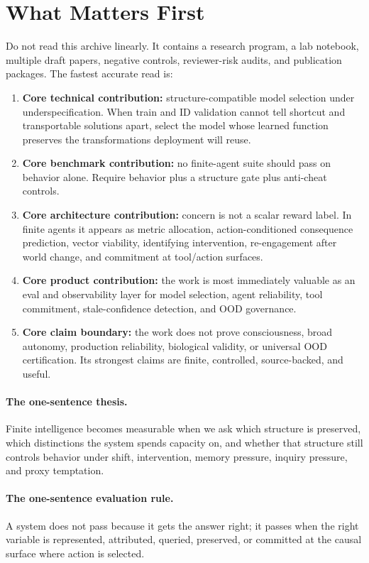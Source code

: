 \documentclass[11pt]{article}
\begin{document}
\section{What Matters First}

Do not read this archive linearly. It contains a research program, a lab
notebook, multiple draft papers, negative controls, reviewer-risk audits, and
publication packages. The fastest accurate read is:

\begin{enumerate}
  \item \textbf{Core technical contribution:} structure-compatible model
  selection under underspecification. When train and ID validation cannot tell
  shortcut and transportable solutions apart, select the model whose learned
  function preserves the transformations deployment will reuse.
  \item \textbf{Core benchmark contribution:} no finite-agent suite should pass
  on behavior alone. Require behavior plus a structure gate plus anti-cheat
  controls.
  \item \textbf{Core architecture contribution:} concern is not a scalar reward
  label. In finite agents it appears as metric allocation, action-conditioned
  consequence prediction, vector viability, identifying intervention,
  re-engagement after world change, and commitment at tool/action surfaces.
  \item \textbf{Core product contribution:} the work is most immediately
  valuable as an eval and observability layer for model selection, agent
  reliability, tool commitment, stale-confidence detection, and OOD governance.
  \item \textbf{Core claim boundary:} the work does not prove consciousness,
  broad autonomy, production reliability, biological validity, or universal OOD
  certification. Its strongest claims are finite, controlled, source-backed,
  and useful.
\end{enumerate}

\paragraph{The one-sentence thesis.}
Finite intelligence becomes measurable when we ask which structure is
preserved, which distinctions the system spends capacity on, and whether that
structure still controls behavior under shift, intervention, memory pressure,
inquiry pressure, and proxy temptation.

\paragraph{The one-sentence evaluation rule.}
A system does not pass because it gets the answer right; it passes when the
right variable is represented, attributed, queried, preserved, or committed at
the causal surface where action is selected.
\end{document}

